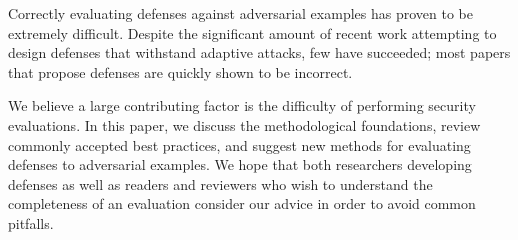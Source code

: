 Correctly evaluating defenses against adversarial examples has proven
to be extremely difficult.
%
Despite the significant amount of recent work attempting
to design defenses that withstand adaptive attacks, few have
succeeded; most papers that propose
defenses are quickly shown to be incorrect.

We believe a large contributing factor is the difficulty of performing
security evaluations.
%
In this paper, we discuss the methodological foundations,
review commonly accepted best
practices, and suggest new methods for evaluating defenses to
adversarial examples.
%
We hope that both researchers developing defenses
as well as readers and reviewers who wish to understand the
completeness of an evaluation
consider our advice in order to avoid common pitfalls.
